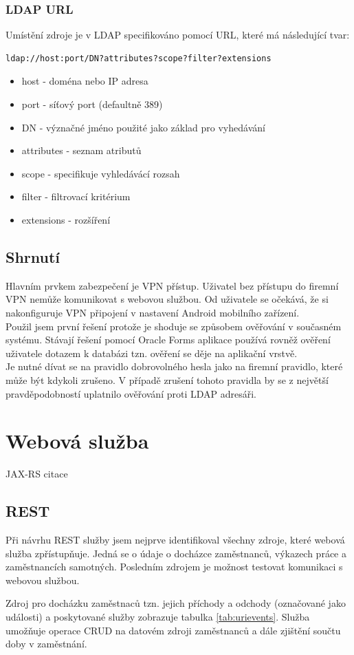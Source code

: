 \documentclass{diplomka}
\begin{document}
\subsection*{LDAP URL}
Umístění zdroje je v LDAP specifikováno pomocí URL, které má následující tvar:
\begin{verbatim}
ldap://host:port/DN?attributes?scope?filter?extensions
\end{verbatim}
\begin{itemize}[noitemsep,nolistsep]
\item host - doména nebo IP adresa
\item port - síťový port (defaultně 389)
\item DN - význačné jméno použité jako základ pro vyhedávání
\item attributes -  seznam atributů
\item scope - specifikuje vyhledávácí rozsah  
\item filter - filtrovací kritérium
\item extensions - rozšíření
\end{itemize}

\section{Shrnutí}
Hlavním prvkem zabezpečení je VPN přístup. Uživatel bez přístupu do firemní VPN nemůže komunikovat s webovou službou. Od uživatele se očekává, že si nakonfiguruje VPN připojení v nastavení Android mobilního zařízení.\\ \indent
Použil jsem první řešení protože je shoduje se způsobem ověřování v současném systému. Stávají řešení pomocí Oracle Forms aplikace používá rovněž ověření uživatele dotazem k databázi tzn. ověření se děje na aplikační vrstvě. \\ \indent
Je nutné dívat se na pravidlo dobrovolného hesla jako na firemní pravidlo, které může být kdykoli zrušeno. V případě zrušení tohoto pravidla by se z největší pravděpodobností uplatnilo ověřování proti LDAP adresáři. 

\chapter{Webová služba}
JAX-RS citace
\section{REST}
Při návrhu REST služby jsem nejprve identifikoval všechny zdroje, které webová služba zpřístupňuje. Jedná se o údaje o docházce zaměstnanců, výkazech práce a zaměstnancích samotných. Posledním zdrojem je možnost testovat komunikaci s webovou službou. \par
Zdroj pro docházku zaměstnaců tzn. jejich příchody a odchody (označované jako události) a poskytované služby zobrazuje tabulka \ref{tab:urievents}. Služba umožňuje operace CRUD na datovém zdroji zaměstnanců a dále zjištění součtu doby v zaměstnání.
\end{document}
